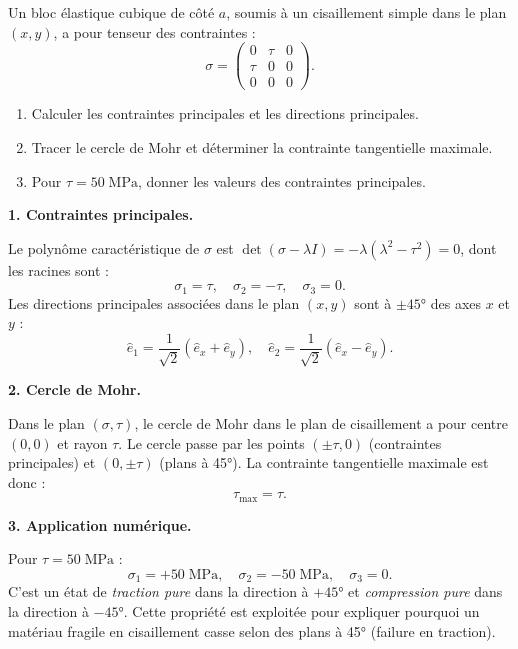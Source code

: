 \documentclass[12pt,a4paper]{article}
\begin{document}
\begin{boiteexercice}
Un bloc élastique cubique de côté $a$, soumis à un cisaillement simple dans le plan $(x,y)$, a pour tenseur des contraintes :
\[
\sigma = \begin{pmatrix} 0 & \tau & 0 \\ \tau & 0 & 0 \\ 0 & 0 & 0 \end{pmatrix}.
\]
\begin{enumerate}
  \item Calculer les contraintes principales et les directions principales.
  \item Tracer le cercle de Mohr et déterminer la contrainte tangentielle maximale.
  \item Pour $\tau = 50\;\text{MPa}$, donner les valeurs des contraintes principales.
\end{enumerate}
\end{boiteexercice}

\begin{boitecorrige}

\textbf{1. Contraintes principales.}

Le polynôme caractéristique de $\sigma$ est $\det(\sigma - \lambda I) = -\lambda(\lambda^2 - \tau^2) = 0$, dont les racines sont :
\[
\sigma_1 = \tau, \quad \sigma_2 = -\tau, \quad \sigma_3 = 0.
\]
Les directions principales associées dans le plan $(x,y)$ sont à $\pm 45°$ des axes $x$ et $y$ :
\[
\hat{e}_1 = \frac{1}{\sqrt{2}}(\hat{e}_x + \hat{e}_y), \quad \hat{e}_2 = \frac{1}{\sqrt{2}}(\hat{e}_x - \hat{e}_y).
\]

\textbf{2. Cercle de Mohr.}

Dans le plan $(\sigma, \tau)$, le cercle de Mohr dans le plan de cisaillement a pour centre $(0, 0)$ et rayon $\tau$. Le cercle passe par les points $(\pm\tau, 0)$ (contraintes principales) et $(0, \pm\tau)$ (plans à 45°). La contrainte tangentielle maximale est donc :
\[
\tau_\text{max} = \tau.
\]

\textbf{3. Application numérique.}

Pour $\tau = 50\;\text{MPa}$ :
\[
\sigma_1 = +50\;\text{MPa}, \quad \sigma_2 = -50\;\text{MPa}, \quad \sigma_3 = 0.
\]
C'est un état de \emph{traction pure} dans la direction à $+45°$ et \emph{compression pure} dans la direction à $-45°$. Cette propriété est exploitée pour expliquer pourquoi un matériau fragile en cisaillement casse selon des plans à 45° (failure en traction).

\end{boitecorrige}
\end{document}
